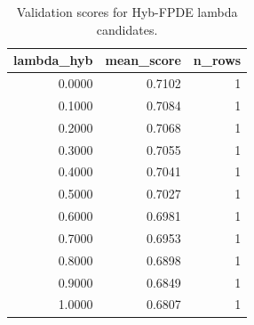\begin{table}[t]
\caption{Validation scores for Hyb-FPDE lambda candidates.}
\label{tab:lambda_distribution_computed}
\centering
\begin{tabular}{rrr}
\toprule
lambda\_hyb & mean\_score & n\_rows \\
\midrule
0.0000 & 0.7102 & 1 \\
0.1000 & 0.7084 & 1 \\
0.2000 & 0.7068 & 1 \\
0.3000 & 0.7055 & 1 \\
0.4000 & 0.7041 & 1 \\
0.5000 & 0.7027 & 1 \\
0.6000 & 0.6981 & 1 \\
0.7000 & 0.6953 & 1 \\
0.8000 & 0.6898 & 1 \\
0.9000 & 0.6849 & 1 \\
1.0000 & 0.6807 & 1 \\
\bottomrule
\end{tabular}

\end{table}
